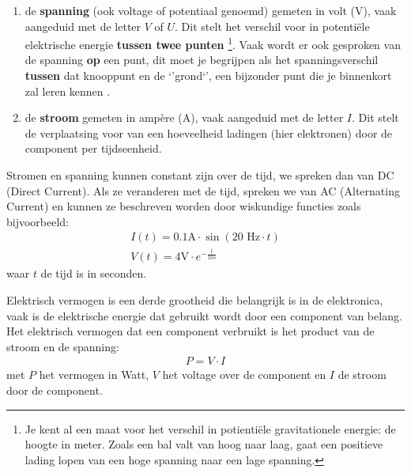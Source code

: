 \documentclass{article}
\begin{document}
		\begin{enumerate}
			\item de \textbf{spanning} (ook voltage of potentiaal genoemd) gemeten in volt (V), vaak aangeduid met de letter $V$ of $U$. Dit stelt het verschil voor in potenti\"ele elektrische energie \textbf{tussen twee punten} \footnote{Je kent al een maat voor het verschil in potienti\"ele gravitationele energie: de hoogte in meter. Zoals een bal valt van hoog naar laag, gaat een positieve lading lopen van een hoge spanning naar een lage spanning.}. Vaak wordt er ook gesproken van de spanning \textbf{op} een punt, dit moet je begrijpen als het spanningsverschil \textbf{tussen} dat knooppunt en de `'grond`', een bijzonder punt die je binnenkort  zal leren kennen .%

			\item de \textbf{stroom} gemeten in amp\`ere (A), vaak aangeduid met de letter $I$. Dit stelt de verplaatsing voor van een hoeveelheid ladingen (hier elektronen) door de component per tijdseenheid.
		\end{enumerate}

		Stromen en spanning kunnen constant zijn over de tijd, we spreken dan van DC (Direct Current). Als ze veranderen met de tijd, spreken we van AC (Alternating Current) en  kunnen ze beschreven worden door wiskundige functies zoals bijvoorbeeld:
		\begin{align}
		     I(t) = 0.1 \text{A} \cdot \sin (20\text{ Hz}\cdot t) \\
		     V(t) = 4 \text{V} \cdot e^{-\frac{t}{10 s}}
		 \end{align} 
		 waar $t$ de tijd is in seconden.

		Elektrisch vermogen  is een derde grootheid die belangrijk is in de elektronica, vaak is de elektrische energie dat gebruikt wordt door een component van belang. Het elektrisch vermogen dat een component verbruikt is het product van de stroom en de spanning:
			\begin{align}
			     P = V \cdot I
			     \label{eq:vermogen}
			 \end{align} 
			 met $P$ het vermogen in Watt, $V$ het voltage over de component en $I$ de stroom door de component.
\end{document}
